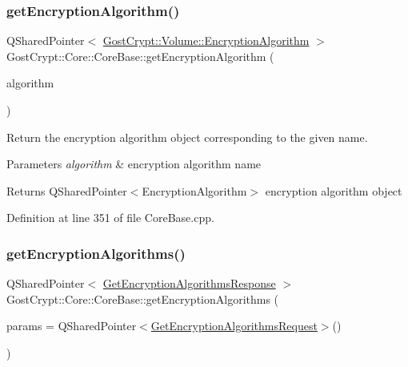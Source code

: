 \subsubsection{\texorpdfstring{get\+Encryption\+Algorithm()}{getEncryptionAlgorithm()}}
{\footnotesize\ttfamily Q\+Shared\+Pointer$<$ \hyperlink{class_gost_crypt_1_1_volume_1_1_encryption_algorithm}{Gost\+Crypt\+::\+Volume\+::\+Encryption\+Algorithm} $>$ Gost\+Crypt\+::\+Core\+::\+Core\+Base\+::get\+Encryption\+Algorithm (\begin{DoxyParamCaption}\item[{Q\+String}]{algorithm }\end{DoxyParamCaption})\hspace{0.3cm}{\ttfamily [protected]}}



Return the encryption algorithm object corresponding to the given name. 


\begin{DoxyParams}{Parameters}
{\em algorithm} & encryption algorithm name \\
\hline
\end{DoxyParams}
\begin{DoxyReturn}{Returns}
Q\+Shared\+Pointer$<$\+Encryption\+Algorithm$>$ encryption algorithm object 
\end{DoxyReturn}


Definition at line 351 of file Core\+Base.\+cpp.

\mbox{\label{class_gost_crypt_1_1_core_1_1_core_base_a1f0f9505278a7ddde8b4b6d341f0beda}} 
\subsubsection{\texorpdfstring{get\+Encryption\+Algorithms()}{getEncryptionAlgorithms()}}
{\footnotesize\ttfamily Q\+Shared\+Pointer$<$ \hyperlink{struct_gost_crypt_1_1_core_1_1_get_encryption_algorithms_response}{Get\+Encryption\+Algorithms\+Response} $>$ Gost\+Crypt\+::\+Core\+::\+Core\+Base\+::get\+Encryption\+Algorithms (\begin{DoxyParamCaption}\item[{Q\+Shared\+Pointer$<$ \hyperlink{struct_gost_crypt_1_1_core_1_1_get_encryption_algorithms_request}{Get\+Encryption\+Algorithms\+Request} $>$}]{params = {\ttfamily QSharedPointer$<$\hyperlink{struct_gost_crypt_1_1_core_1_1_get_encryption_algorithms_request}{Get\+Encryption\+Algorithms\+Request}$>$()} }\end{DoxyParamCaption})\hspace{0.3cm}{\ttfamily [protected]}}



